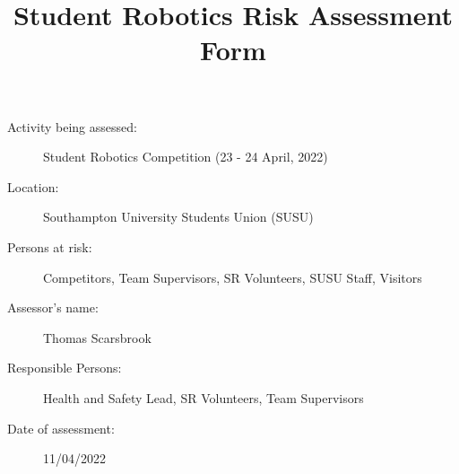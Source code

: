 \documentclass[12pt,a4paper]{scrartcl}
\title{Student Robotics Risk Assessment Form}
\begin{document}
\maketitle

\begin{description}
\item[Activity being assessed:] Student Robotics Competition (23 - 24 April, 2022)
\item[Location:] Southampton University Students Union (SUSU)
\item[Persons at risk:] Competitors, Team Supervisors, SR Volunteers, SUSU Staff, Visitors
\end{description}

\begin{description}
\item[Assessor's name:] Thomas Scarsbrook
\item[Responsible Persons:] Health and Safety Lead, SR Volunteers, Team Supervisors
\item[Date of assessment:] 11/04/2022
\end{description}
\clearpage

\renewcommand{\cellalign}{tl}
\renewcommand{\theadalign}{tl}

\newcommand{\risk}[4]{
	#1 & #2 & #3 & #4 \\
}
\end{document}
